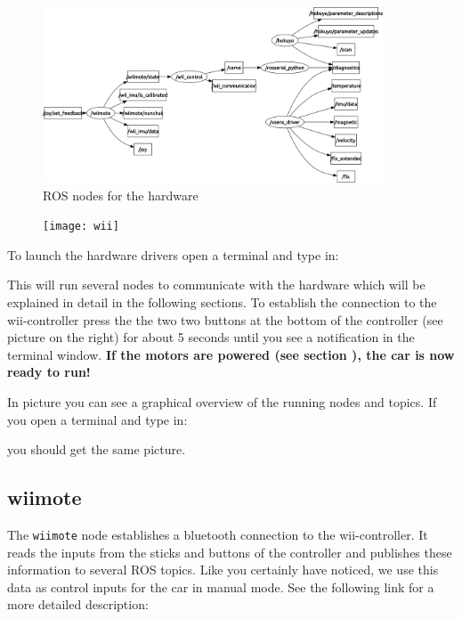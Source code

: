 \begin{figure}[h]
	\centering
		\includegraphics[width=0.9\textwidth]{diagrams/rqt_hardware}
	\caption{ROS nodes for the hardware}
	\label{fig:rqt_hardware}
\end{figure}

\begin{figure}
  \begin{center}
    \texttt{[image: wii]}
		\caption{}
		\label{fig:wii_controller}
  \end{center}	
\end{figure}

To launch the hardware drivers open a terminal and type in:


This will run several nodes to communicate with the hardware which will be explained in detail in the following sections. To establish the connection to the wii-controller press the the two two buttons at the bottom of the controller (see picture  on the right) for about 5 seconds until you see a notification in the terminal window. \textbf{If the motors are powered (see section ), the car is now ready to run!}

In picture  you can see a graphical overview of the running nodes and topics. If you open a terminal and type in:


you should get the same picture.


\subsection{wiimote}
\label{sec:tas_package_drivers_wiimote}
The \texttt{wiimote} node establishes a bluetooth connection to the wii-controller. It reads the inputs from the sticks and buttons of the controller and publishes these information to several ROS topics. Like you certainly have noticed, we use this data as control inputs for the car in manual mode. See the following link for a more detailed description:

